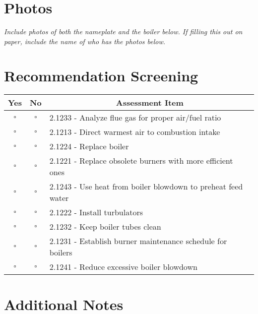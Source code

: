 \documentclass[./main.tex]{subfiles}
\begin{document}
\section*{Photos}
\emph{Include photos of both the nameplate and the boiler below. If filling this out on paper, include the name of who has the photos below. }


\clearpage \section*{Recommendation Screening}
\begin{tabular}{|c|c|p{13.5cm}|}
\hline
\multicolumn{1}{|c|}{\textbf{Yes}} & \multicolumn{1}{c|}{\textbf{No}} & \multicolumn{1}{c|}{\textbf{Assessment Item}} \\
\hline
$\square$ & $\square$ & 2.1233 - Analyze flue gas for proper air/fuel ratio \\
\hline
$\square$ & $\square$ & 2.1213 - Direct warmest air to combustion intake \\
\hline
$\square$ & $\square$ & 2.1224 - Replace boiler \\
\hline
$\square$ & $\square$ & 2.1221 - Replace obsolete burners with more efficient ones \\
\hline
$\square$ & $\square$ & 2.1243 - Use heat from boiler blowdown to preheat feed water \\
\hline
$\square$ & $\square$ & 2.1222 - Install turbulators \\
\hline
$\square$ & $\square$ & 2.1232 - Keep boiler tubes clean \\
\hline
$\square$ & $\square$ & 2.1231 - Establish burner maintenance schedule for boilers \\
\hline
$\square$ & $\square$ & 2.1241 - Reduce excessive boiler blowdown \\
\hline
\end{tabular}

\section*{Additional Notes}
\vspace{4cm}



\end{document}
